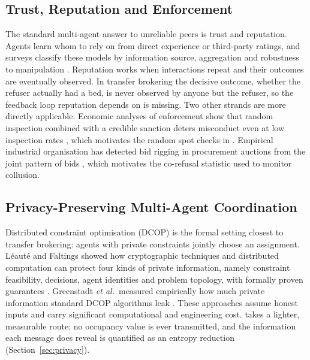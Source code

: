 \subsection{Trust, Reputation and Enforcement}
The standard multi-agent answer to unreliable peers is trust and reputation. Agents learn whom to rely on from direct experience or third-party ratings, and surveys classify these models by information source, aggregation and robustness to manipulation \cite{ramchurn2004trust,sabater2005trust,josang2007survey}. Reputation works when interactions repeat and their outcomes are eventually observed. In transfer brokering the decisive outcome, whether the refuser actually had a bed, is never observed by anyone but the refuser, so the feedback loop reputation depends on is missing. Two other strands are more directly applicable. Economic analyses of enforcement show that random inspection combined with a credible sanction deters misconduct even at low inspection rates \cite{becker1968crime}, which motivates the random spot checks in \mahros{}. Empirical industrial organisation has detected bid rigging in procurement auctions from the joint pattern of bids \cite{porter1993bidrigging}, which motivates the co-refusal statistic used to monitor collusion.

\subsection{Privacy-Preserving Multi-Agent Coordination}
Distributed constraint optimisation (DCOP) is the formal setting closest to transfer brokering: agents with private constraints jointly choose an assignment. Léauté and Faltings showed how cryptographic techniques and distributed computation can protect four kinds of private information, namely constraint feasibility, decisions, agent identities and problem topology, with formally proven guarantees \cite{leaute2013privacy}. Greenstadt \emph{et al.}\ measured empirically how much private information standard DCOP algorithms leak \cite{greenstadt2006privacy}. These approaches assume honest inputs and carry significant computational and engineering cost. \mahros{} takes a lighter, measurable route: no occupancy value is ever transmitted, and the information each message does reveal is quantified as an entropy reduction (Section~\ref{sec:privacy}).


